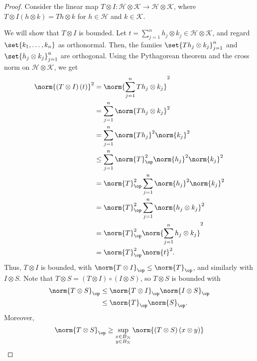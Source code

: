 \documentclass[10pt]{mypackage}
\begin{document}
\begin{proof}
  Consider the linear map $T\otimes I\colon \mathcal{H}\otimes \mathcal{K}\rightarrow \mathcal{H}\otimes \mathcal{K}$, where $T\otimes I\left( h\otimes k \right) = Th\otimes k$ for $h\in \mathcal{H}$ and $k\in \mathcal{K}$.\newline

  We will show that $T\otimes I$ is bounded. Let $t = \sum_{j=1}^{n}h_j\otimes k_j\in \mathcal{H}\otimes \mathcal{K}$, and regard $\set{k_1,\dots,k_n}$ as orthonormal. Then, the famiies $\set{Th_j\otimes k_j}_{j=1}^{n}$ and $\set{h_j\otimes k_j}_{j=1}^{n}$ are orthogonal. Using the Pythagorean theorem and the cross norm on $\mathcal{H}\otimes \mathcal{K}$, we get
  \begin{align*}
    \norm{\left( T\otimes I \right)\left( t \right)}^2 &= \norm{\sum_{j=1}^{n}Th_j\otimes k_j}^2\\
                                                       &= \sum_{j=1}^{n}\norm{Th_j\otimes k_j}^2\\
                                                       &= \sum_{j=1}^{n} \norm{Th_j}^2\norm{k_j}^2\\
                                                       &\leq \sum_{j=1}^{n}\norm{T}_{\op}^2\norm{h_j}^2\norm{k_j}^2\\
                                                       &= \norm{T}_{\op}^2\sum_{j=1}^{n}\norm{h_j}^2\norm{k_j}^2\\
                                                       &= \norm{T}_{\op}^2 \sum_{j=1}^{n}\norm{h_j\otimes k_j}^2\\
                                                       &= \norm{T}_{\op}^2 \norm{\sum_{j=1}^{n}h_j\otimes k_j}^2\\
                                                       &= \norm{T}_{\op}^2\norm{t}^2.
  \end{align*}
  Thus, $T\otimes I$ is bounded, with $\norm{T\otimes I}_{\op}\leq \norm{T}_{\op}$, and similarly with $I\otimes S$. Note that $T\otimes S = \left( T\otimes I \right)\circ \left( I\otimes S \right)$, so $T\otimes S$ is bounded with
  \begin{align*}
    \norm{T\otimes S}_{\op} &\leq \norm{T\otimes I}_{\op}\norm{I\otimes S}_{\op}\\
                            &\leq \norm{T}_{\op}\norm{S}_{\op}.
  \end{align*}
  Moreover,
  \begin{align*}
    \norm{T\otimes S}_{\op} &\geq \sup_{\substack{x\in B_{\mathcal{H}}\\y\in B_{\mathcal{K}}}}\norm{\left( T\otimes S \right)\left( x\otimes y \right)}\\

\end{align*}
\end{proof}
\end{document}
